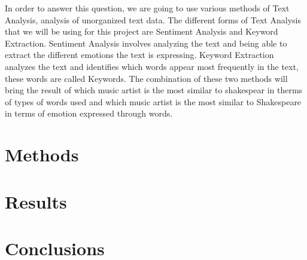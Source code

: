 \documentclass[11pt]{article}
\begin{document}
In order to answer this question, we are going to use various methods of Text Analysis, analysis of unorganized text data\cite{monkey}. The different forms of Text Analysis that we will be using for this project are Sentiment Analysis and Keyword Extraction. Sentiment Analysis involves analyzing the text and being able to extract the different emotions the text is expressing\cite{monkey}. Keyword Extraction analyzes the text and identifies which words appear most frequently in the text, these words are called Keywords\cite{monkey}. The combination of these two methods will bring the result of which music artist is the most similar to shakespear in therms of types of words used and which music artist is the most similar to Shakespeare in terms of emotion expressed through words.  

\section{Methods}

%


\section{Results}


\section{Conclusions}



\newpage{}


 
\end{document}
